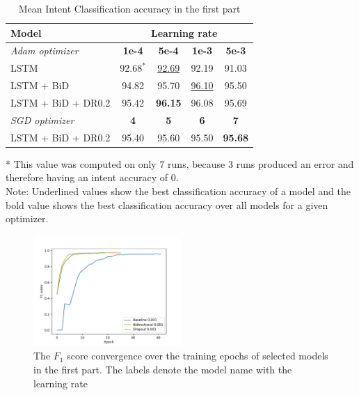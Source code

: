 \documentclass[a4paper]{article}
\begin{document}
\begin{table}[htbp]
  \caption{Mean Intent Classification accuracy in the first part}
  \label{tab:intent_accuracy_part1}
  \begin{tabular}{l|c c c c}
    \toprule
    \textbf{Model} & \multicolumn{4}{c}{\textbf{Learning rate} } \\
    \midrule
    \textit{Adam optimizer} & \textbf{1e-4} & \textbf{5e-4} & \textbf{1e-3} & \textbf{5e-3} \\
    \midrule
    LSTM & ${92.68}^*$ & \underline{92.69} & 92.19 & 91.03 \\
    LSTM + BiD & 94.82 & 95.70 & \underline{96.10} & 95.50 \\
    LSTM + BiD + DR0.2 & 95.42 & \textbf{96.15} & 96.08 & 95.69 \\
    \toprule
    \textit{SGD optimizer} & \textbf{4}	& \textbf{5} & \textbf{6} & \textbf{7} \\
    \midrule
    LSTM + BiD + DR0.2 & 95.40	& 95.60 & 95.50 & \textbf{95.68}\\
    \bottomrule
  \end{tabular}
  \begin{minipage}{7.5cm}
    \vspace{0.1cm}
    * This value was computed on only 7 runs, because 3 runs produced an error and therefore having an intent accuracy of 0.\\
    Note: Underlined values show the best classification accuracy of a model and the bold value shows the best classification accuracy over all models for a given optimizer. 
  \end{minipage}
\end{table}

\begin{figure}[htbp]
  \centering
  \includegraphics[width=0.5\textwidth]{part1_convergence.pdf}
  \caption{The $F_1$ score convergence over the training epochs of selected models in the first part. The labels denote the model name with the learning rate}
  \label{fig:part_1_convergence}  
\end{figure}
\end{document}
